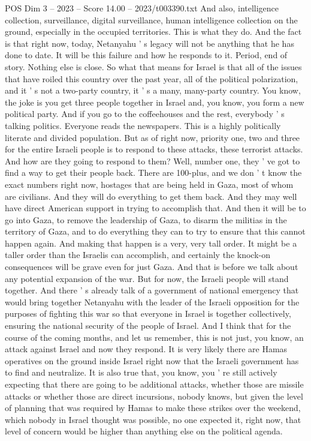 \begin{textsample}{POS Dim 3 – 2023 – Score 14.00 – 2023/t003390.txt}
And also, intelligence collection, surveillance, digital surveillance, human intelligence collection on the ground, especially in the occupied territories.
This is what they do.
And the fact is that right now, today, Netanyahu ' s legacy will not be anything that he has done to date.
It will be this failure and how he responds to it.
Period, end of story.
Nothing else is close.
So what that means for Israel is that all of the issues that have roiled this country over the past year, all of the political polarization, and it ' s not a two-party country, it ' s a many, many-party country.
You know, the joke is you get three people together in Israel and, you know, you form a new political party.
And if you go to the coffeehouses and the rest, everybody ' s talking politics.
Everyone reads the newspapers.
This is a highly politically literate and divided population.
But as of right now, priority one, two and three for the entire Israeli people is to respond to these attacks, these terrorist attacks.
And how are they going to respond to them?
Well, number one, they ' ve got to find a way to get their people back.
There are 100-plus, and we don ' t know the exact numbers right now, hostages that are being held in Gaza, most of whom are civilians.
And they will do everything to get them back.
And they may well have direct American support in trying to accomplish that.
And then it will be to go into Gaza, to remove the leadership of Gaza, to disarm the militias in the territory of Gaza, and to do everything they can to try to ensure that this cannot happen again.
And making that happen is a very, very tall order.
It might be a taller order than the Israelis can accomplish, and certainly the knock-on consequences will be grave even for just Gaza.
And that is before we talk about any potential expansion of the war.
But for now, the Israeli people will stand together.
And there ' s already talk of a government of national emergency that would bring together Netanyahu with the leader of the Israeli opposition for the purposes of fighting this war so that everyone in Israel is together collectively, ensuring the national security of the people of Israel.
And I think that for the course of the coming months, and let us remember, this is not just, you know, an attack against Israel and now they respond.
It is very likely there are Hamas operatives on the ground inside Israel right now that the Israeli government has to find and neutralize.
It is also true that, you know, you ' re still actively expecting that there are going to be additional attacks, whether those are missile attacks or whether those are direct incursions, nobody knows, but given the level of planning that was required by Hamas to make these strikes over the weekend, which nobody in Israel thought was possible, no one expected it, right now, that level of concern would be higher than anything else on the political agenda.

\end{textsample}
